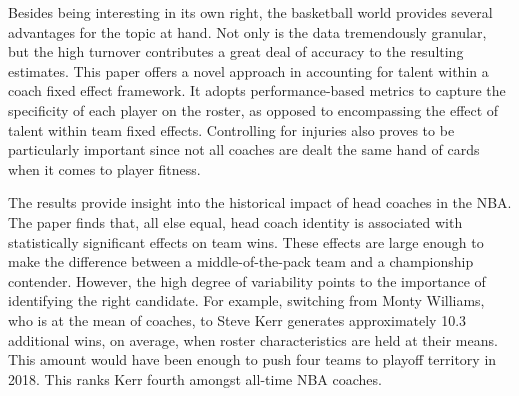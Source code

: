 \documentclass[main.tex]{subfiles}
\begin{document}
Besides being interesting in its own right, the basketball world provides several advantages for the topic at hand. Not only is the data tremendously granular, but the high turnover contributes a great deal of accuracy to the resulting estimates. This paper offers a novel approach in accounting for talent within a coach fixed effect framework. It adopts performance-based metrics to capture the specificity of each player on the roster, as opposed to encompassing the effect of talent within team fixed effects. Controlling for injuries also proves to be particularly important since not all coaches are dealt the same hand of cards when it comes to player fitness.

The results provide insight into the historical impact of head coaches in the NBA. The paper finds that, all else equal, head coach identity is associated with statistically significant effects on team wins. These effects are large enough to make the difference between a middle-of-the-pack team and a championship contender. However, the high degree of variability points to the importance of identifying the right candidate. For example, switching from Monty Williams, who is at the mean of coaches, to Steve Kerr generates approximately 10.3 additional wins, on average, when roster characteristics are held at their means. This amount would have been enough to push four teams to playoff territory in 2018. This ranks Kerr fourth amongst all-time NBA coaches.

\end{document}
